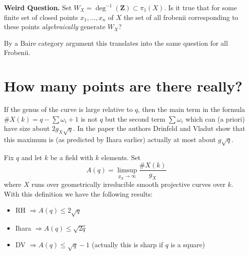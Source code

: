 \noindent
{\bf Weird Question.}
Set $W_X = \deg^{-1}(\mathbf{Z})\subset \pi_1(X)$.
Is it true that for some finite set of closed points $x_1, \ldots, x_n$ of $X$
the set of all frobenii corresponding to these points
{\it algebraically} generate $W_X$?

\medskip\noindent
By a Baire category argument this translates into the same question
for all Frobenii.





\section{How many points are there really?}
\label{section-really}

\noindent
If the genus of the curve is large relative to $q$, then the main
term in the formula $\# X(k) = q - \sum \omega_i + 1$ is not $q$
but the second term $\sum \omega_i$ which can (a priori) have
size about $2g_X\sqrt{q}$. In the paper \cite{Drinfeld-number}
the authors Drinfeld and Vladut show that this maximum is (as predicted
by Ihara earlier) actually at most about $g\sqrt{q}$.

\medskip\noindent
Fix $q$ and let $k$ be a field with $k$ elements. Set
$$
A(q) = \limsup_{g_X \to \infty} \frac{\# X(k)}{g_X}
$$
where $X$ runs over geometrically irreducible smooth projective
curves over $k$. With this definition we have the following results:
\begin{itemize}
\item RH $\Rightarrow A(q)\leq 2\sqrt{q}$
\item Ihara $\Rightarrow A(q)\leq \sqrt{2q}$
\item DV $\Rightarrow A(q)\leq \sqrt{q}-1$ (actually this is sharp if $q$
is a square)
\end{itemize}

